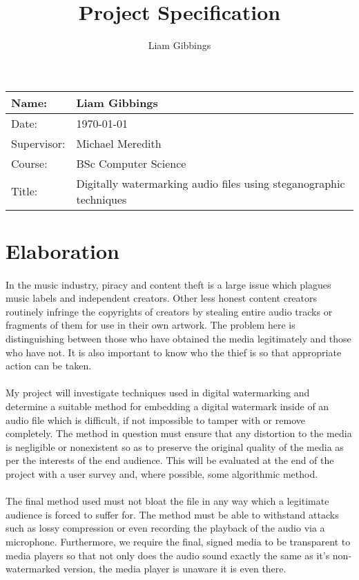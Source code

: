 \documentclass{article}
\title{Project Specification}
\author{Liam Gibbings}
\begin{document}
	\maketitle
	\begin{table}[htbp]
		\centering
		\label{title-table}
		\begin{tabular}{|l|l|}
			\hline
			Name: & Liam Gibbings \\ \hline
			Date: & \today \\ \hline
			Supervisor: & Michael Meredith \\ \hline
			Course: & BSc Computer Science \\ \hline
			Title: & Digitally watermarking audio files using steganographic techniques \\ \hline
		\end{tabular}
	\end{table}
	
	\setcounter{secnumdepth}{0}
	\section{Elaboration}
	\paragraph{}
	In the music industry, piracy and content theft is a large issue which plagues music labels and independent creators. Other less honest content creators routinely infringe the copyrights of creators by stealing entire audio tracks or fragments of them for use in their own artwork. The problem here is distinguishing between those who have obtained the media legitimately and those who have not. It is also important to know who the thief is so that appropriate action can be taken.
	\paragraph{}
	My project will investigate techniques used in digital watermarking and determine a suitable method for embedding a digital watermark inside of an audio file which is difficult, if not impossible to tamper with or remove completely. The method in question must ensure that any distortion to the media is negligible or nonexistent so as to preserve the original quality of the media as per the interests of the end audience. This will be evaluated at the end of the project with a user survey and, where possible, some algorithmic method.
	\paragraph{}
	The final method used must not bloat the file in any way which a legitimate audience is forced to suffer for. The method must be able to withstand attacks such as lossy compression or even recording the playback of the audio via a microphone. Furthermore, we require the final, signed media to be transparent to media players so that not only does the audio sound exactly the same as it's non-watermarked version, the media player is unaware it is even there.
\end{document}
